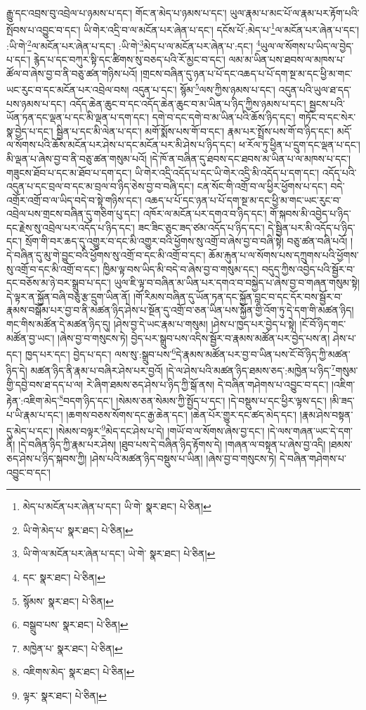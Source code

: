 རྒྱུ་དང་འབྲས་བུ་འབྲེལ་པ་ཉམས་པ་དང་། གོང་ན་མེད་པ་ཉམས་པ་དང་། ཡུལ་རྣམ་པ་མང་པོ་ལ་རྣམ་པར་རྟོག་པའི་སྤོབས་པ་འབྱུང་བ་དང་། ཡི་གེར་འདྲི་བ་ལ་མངོན་པར་ཞེན་པ་དང་། དངོས་པོ་:མེད་པ་\footnote{མེད་པ་མངོན་པར་ཞེན་པ་དང་། ཡི་གེ་  སྣར་ཐང་།  པེ་ཅིན། }ལ་མངོན་པར་ཞེན་པ་དང་། :ཡི་གེ་\footnote{ཡི་གེ་མེད་པ་  སྣར་ཐང་།  པེ་ཅིན། }ལ་མངོན་པར་ཞེན་པ་དང་། :ཡི་གེ་\footnote{ཡི་གེ་ལ་མངོན་པར་ཞེན་པ་དང་། ཡེ་གེ་  སྣར་ཐང་།  པེ་ཅིན། }མེད་པ་ལ་མངོན་པར་ཞེན་པ་:དང་། \footnote{དང་  སྣར་ཐང་།  པེ་ཅིན། }ཡུལ་ལ་སོགས་པ་ཡིད་ལ་བྱེད་པ་དང་། རྙེད་པ་དང་བཀུར་སྟི་དང་ཚིགས་སུ་བཅད་པའི་རོ་མྱང་བ་དང་། ལམ་མ་ཡིན་པས་ཐབས་ལ་མཁས་པ་ཚོལ་བ་ཞེས་བྱ་བ་ནི་བཅུ་ཚན་གཉིས་པའོ། །གྲངས་བཞིན་དུ་ཉན་པ་པོ་དང་འཆད་པ་པོ་དག་སྔ་མ་དང་ཕྱི་མ་གང་ཡང་རུང་བ་དང་མངོན་པར་འབྲེལ་བས། འདུན་པ་དང་། སྙོམ་\footnote{སྙོམས་  སྣར་ཐང་།  པེ་ཅིན། }ལས་ཀྱིས་ཉམས་པ་དང་། འདུན་པའི་ཡུལ་ཐ་དད་པས་ཉམས་པ་དང་། འདོད་ཆེན་ཆུང་བ་དང་འདོད་ཆེན་ཆུང་བ་མ་ཡིན་པ་ཉིད་ཀྱིས་ཉམས་པ་དང་། སྦྱངས་པའི་ཡོན་ཏན་དང་ལྡན་པ་དང་མི་ལྡན་པ་དག་དང་། དགེ་བ་དང་དགེ་བ་མ་ཡིན་པའི་ཆོས་ཉིད་དང་། གཏོང་བ་དང་སེར་སྣ་བྱེད་པ་དང་། སྦྱིན་པ་དང་མི་ལེན་པ་དང་། མགོ་སྨོས་པས་གོ་བ་དང་། རྣམ་པར་སྤྲོས་པས་གོ་བ་ཉིད་དང་། མདོ་ལ་སོགས་པའི་ཆོས་མངོན་པར་ཤེས་པ་དང་མངོན་པར་མི་ཤེས་པ་ཉིད་དང་། ཕ་རོལ་ཏུ་ཕྱིན་པ་དྲུག་དང་ལྡན་པ་དང་། མི་ལྡན་པ་ཞེས་བྱ་བ་ནི་བཅུ་ཚན་གསུམ་པའོ། །དེ་ཁོ་ན་བཞིན་དུ་ཐབས་དང་ཐབས་མ་ཡིན་པ་ལ་མཁས་པ་དང་། གཟུངས་ཐོབ་པ་དང་མ་ཐོབ་པ་དག་དང་། ཡི་གེར་འདྲི་འདོད་པ་དང་ཡི་གེར་འདྲི་མི་འདོད་པ་དག་དང་། འདོད་པའི་འདུན་པ་དང་བྲལ་བ་དང་མ་བྲལ་བ་ཉིད་ཅེས་བྱ་བ་བཞི་དང་། ངན་སོང་གི་འགྲོ་བ་ལ་ཕྱིར་ཕྱོགས་པ་དང་། བདེ་འགྲོར་འགྲོ་བ་ལ་ཡིད་བདེ་བ་སྟེ་གཉིས་དང་། འཆད་པ་པོ་དང་ཉན་པ་པོ་དག་སྔ་མ་དང་ཕྱི་མ་གང་ཡང་རུང་བ་འབྲེལ་པས་གྲངས་བཞིན་དུ་གཅིག་པུ་དང་། འཁོར་ལ་མངོན་པར་དགའ་བ་ཉིད་དང་། གོ་སྐབས་མི་འབྱེད་པ་ཉིད་དང་རྗེས་སུ་འབྲེལ་པར་འདོད་པ་ཉིད་དང་། ཟང་ཟིང་ཅུང་ཟད་ཙམ་འདོད་པ་ཉིད་དང་། དེ་སྦྱིན་པར་མི་འདོད་པ་ཉིད་དང་། སྲོག་གི་བར་ཆད་དུ་འགྱུར་བ་དང་མི་འགྱུར་བའི་ཕྱོགས་སུ་འགྲོ་བ་ཞེས་བྱ་བ་བཞི་སྟེ། བཅུ་ཚན་བཞི་པའོ། །དེ་བཞིན་དུ་མུ་གེ་བྱུང་བའི་ཕྱོགས་སུ་འགྲོ་བ་དང་མི་འགྲོ་བ་དང་། ཆོམ་རྐུན་པ་ལ་སོགས་པས་དཀྲུགས་པའི་ཕྱོགས་སུ་འགྲོ་བ་དང་མི་འགྲོ་བ་དང་། ཁྱིམ་ལྟ་བས་ཡིད་མི་བདེ་བ་ཞེས་བྱ་བ་གསུམ་དང་། བདུད་ཀྱིས་འབྱེད་པའི་སྦྱོར་བ་དང་བཅོས་མ་ཉེ་བར་སྒྲུབ་པ་དང་། ཡུལ་ཇི་ལྟ་བ་བཞིན་མ་ཡིན་པར་དགའ་བ་བསྐྱེད་པ་ཞེས་བྱ་བ་གཞན་གསུམ་སྟེ། དེ་ལྟར་ན་སྐྱོན་བཞི་བཅུ་རྩ་དྲུག་ཡིན་ནོ། །གོ་རིམས་བཞིན་དུ་ཡོན་ཏན་དང་སྐྱོན་བླང་བ་དང་དོར་བས་སྦྱོར་བ་རྣམས་བསྒོམ་པར་བྱ་བ་ནི་མཚན་ཉིད་ཤེས་པ་སྔོན་དུ་འགྲོ་བ་ཅན་ཡིན་པས་སྐྱོན་གྱི་འོག་ཏུ་དེ་དག་གི་མཚན་ཉིད། གང་གིས་མཚོན་དེ་མཚན་ཉིད་དུ། །ཤེས་བྱ་དེ་ཡང་རྣམ་པ་གསུམ། །ཤེས་པ་ཁྱད་པར་བྱེད་པ་སྟེ། །ངོ་བོ་ཉིད་གང་མཚོན་བྱ་ཡང་། །ཞེས་བྱ་བ་གསུངས་ཏེ། བྱེད་པར་སྒྲུབ་པས་འདིས་སྦྱོར་བ་རྣམས་མཚོན་པར་བྱེད་པས་ན། ཤེས་པ་དང་། ཁྱད་པར་དང་། བྱེད་པ་དང་། ལས་སུ་:སྒྲུབ་པས་\footnote{བསྒྲུབ་པས་  སྣར་ཐང་།  པེ་ཅིན། }དེ་རྣམས་མཚོན་པར་བྱ་བ་ཡིན་པས་ངོ་བོ་ཉིད་ཀྱི་མཚན་ཉིད་དེ། མཚན་ཉིད་ནི་རྣམ་པ་བཞིར་ཤེས་པར་བྱའོ། །དེ་ལ་ཤེས་པའི་མཚན་ཉིད་ཐམས་ཅད་:མཁྱེན་པ་ཉིད་\footnote{མཁྱེན་པ་  སྣར་ཐང་།  པེ་ཅིན། }གསུམ་གྱི་དབྱེ་བས་ཐ་དད་པ་ལ། རེ་ཞིག་ཐམས་ཅད་ཤེས་པ་ཉིད་ཀྱི་སྒོ་ནས། དེ་བཞིན་གཤེགས་པ་འབྱུང་བ་དང་། །འཇིག་རྟེན་:འཇིག་མེད་\footnote{འཇིགས་མེད་  སྣར་ཐང་།  པེ་ཅིན། }བདག་ཉིད་དང་། །སེམས་ཅན་སེམས་ཀྱི་སྤྱོད་པ་དང་། །དེ་བསྡུས་པ་དང་ཕྱིར་ལྟས་དང་། །མི་ཟད་པ་ཡི་རྣམ་པ་དང་། །ཆགས་བཅས་སོགས་དང་རྒྱ་ཆེན་དང་། །ཆེན་པོར་གྱུར་དང་ཚད་མེད་དང་། །རྣམ་ཤེས་བསྟན་དུ་མེད་པ་དང་། །སེམས་བལྟར་\footnote{ལྟར་  སྣར་ཐང་།  པེ་ཅིན། }མེད་དང་ཤེས་པ་དེ། །གཡོ་བ་ལ་སོགས་ཞེས་བྱ་དང་། །དེ་ལས་གཞན་ཡང་དེ་དག་ནི། །དེ་བཞིན་ཉིད་ཀྱི་རྣམ་པར་ཤེས། །ཐུབ་པས་དེ་བཞིན་ཉིད་རྟོགས་དེ། །གཞན་ལ་བསྟན་པ་ཞེས་བྱ་འདི། །ཐམས་ཅད་ཤེས་པ་ཉིད་སྐབས་ཀྱི། །ཤེས་པའི་མཚན་ཉིད་བསྡུས་པ་ཡིན། །ཞེས་བྱ་བ་གསུངས་ཏེ། དེ་བཞིན་གཤེགས་པ་འབྱུང་བ་དང་། 